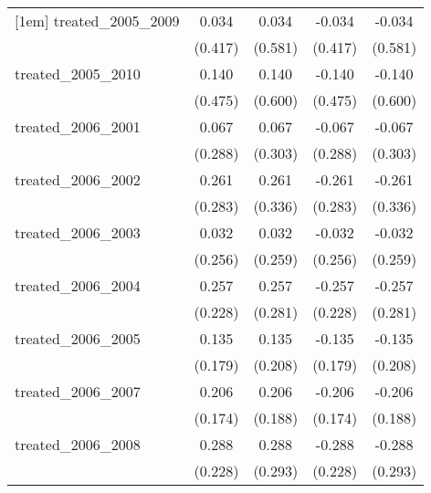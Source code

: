 {\begin{tabular}{l*{4}{c}}
[1em]
treated\_2005\_2009&       0.034         &       0.034         &      -0.034         &      -0.034         \\
            &     (0.417)         &     (0.581)         &     (0.417)         &     (0.581)         \\
[1em]
treated\_2005\_2010&       0.140         &       0.140         &      -0.140         &      -0.140         \\
            &     (0.475)         &     (0.600)         &     (0.475)         &     (0.600)         \\
[1em]
treated\_2006\_2001&       0.067         &       0.067         &      -0.067         &      -0.067         \\
            &     (0.288)         &     (0.303)         &     (0.288)         &     (0.303)         \\
[1em]
treated\_2006\_2002&       0.261         &       0.261         &      -0.261         &      -0.261         \\
            &     (0.283)         &     (0.336)         &     (0.283)         &     (0.336)         \\
[1em]
treated\_2006\_2003&       0.032         &       0.032         &      -0.032         &      -0.032         \\
            &     (0.256)         &     (0.259)         &     (0.256)         &     (0.259)         \\
[1em]
treated\_2006\_2004&       0.257         &       0.257         &      -0.257         &      -0.257         \\
            &     (0.228)         &     (0.281)         &     (0.228)         &     (0.281)         \\
[1em]
treated\_2006\_2005&       0.135         &       0.135         &      -0.135         &      -0.135         \\
            &     (0.179)         &     (0.208)         &     (0.179)         &     (0.208)         \\
[1em]
treated\_2006\_2007&       0.206         &       0.206         &      -0.206         &      -0.206         \\
            &     (0.174)         &     (0.188)         &     (0.174)         &     (0.188)         \\
[1em]
treated\_2006\_2008&       0.288         &       0.288         &      -0.288         &      -0.288         \\
            &     (0.228)         &     (0.293)         &     (0.228)         &     (0.293)         \\

\end{tabular}}
